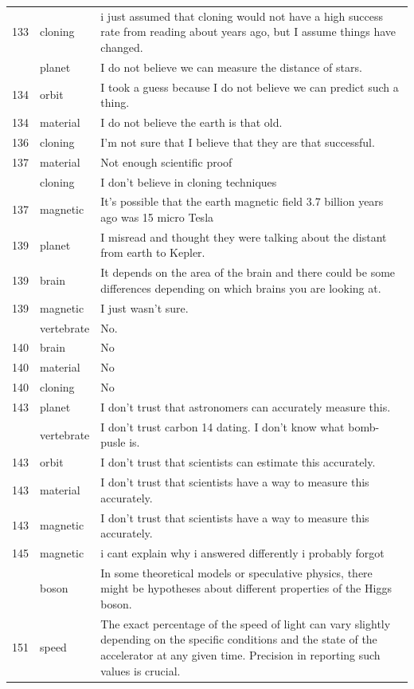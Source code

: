 \documentclass[
  doc,floatsintext]{apa6}
\begin{document}
\begin{longtable}[t]{>{}r>{}l>{\raggedright\arraybackslash}p{30em}}
133 & cloning & i just assumed that cloning would not have a high success rate from reading about years ago, but I assume things have changed.\\
\addlinespace
134 & planet & I do not believe we can measure the distance of stars.\\
134 & orbit & I took a guess because I do not believe we can predict such a thing.\\
134 & material & I do not believe the earth is that old.\\
136 & cloning & I’m not sure that I believe that they are that successful.\\
137 & material & Not enough scientific proof\\
\addlinespace
137 & cloning & I don't believe in cloning techniques\\
137 & magnetic & It's possible that the earth magnetic field 3.7 billion years ago was 15 micro Tesla\\
139 & planet & I misread and thought they were talking about the distant from earth to Kepler.\\
139 & brain & It depends on the area of the brain and there could be some differences depending on which brains you are looking at.\\
139 & magnetic & I just wasn't sure.\\
\addlinespace
140 & vertebrate & No.\\
140 & brain & No\\
140 & material & No\\
140 & cloning & No\\
143 & planet & I don't trust that astronomers can accurately measure this.\\
\addlinespace
143 & vertebrate & I don't trust carbon 14 dating. I don't know what bomb-pusle is.\\
143 & orbit & I don't trust that scientists can estimate this accurately.\\
143 & material & I don't trust that scientists have a way to measure this accurately.\\
143 & magnetic & I don't trust that scientists have a way to measure this accurately.\\
145 & magnetic & i cant explain why i answered differently i probably forgot\\
\addlinespace
151 & boson & In some theoretical models or speculative physics, there might be hypotheses about different properties of the Higgs boson.\\
151 & speed & The exact percentage of the speed of light can vary slightly depending on the specific conditions and the state of the accelerator at any given time. Precision in reporting such values is crucial.\\

\end{longtable}
\end{document}
